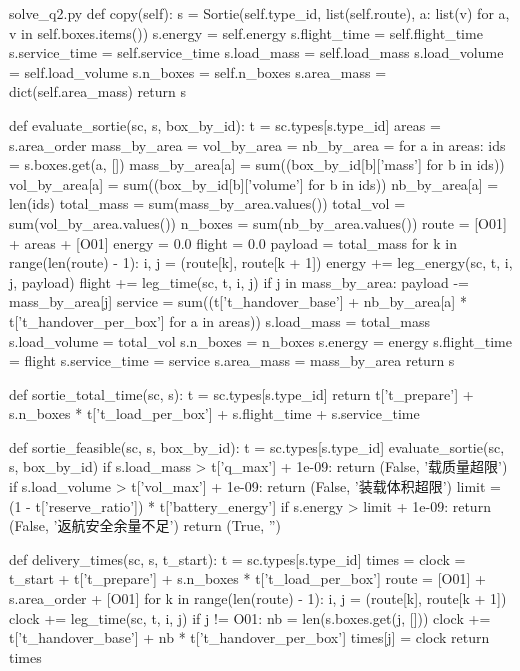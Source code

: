\documentclass[bwprint]{gmcmthesis}
\begin{document}
\begin{appendices}
\begin{Python}{solve\_q2.py}
    def copy(self):
        s = Sortie(self.type_id, list(self.route), {a: list(v) for a, v in self.boxes.items()})
        s.energy = self.energy
        s.flight_time = self.flight_time
        s.service_time = self.service_time
        s.load_mass = self.load_mass
        s.load_volume = self.load_volume
        s.n_boxes = self.n_boxes
        s.area_mass = dict(self.area_mass)
        return s

def evaluate_sortie(sc, s, box_by_id):
    t = sc.types[s.type_id]
    areas = s.area_order
    mass_by_area = {}
    vol_by_area = {}
    nb_by_area = {}
    for a in areas:
        ids = s.boxes.get(a, [])
        mass_by_area[a] = sum((box_by_id[b]['mass'] for b in ids))
        vol_by_area[a] = sum((box_by_id[b]['volume'] for b in ids))
        nb_by_area[a] = len(ids)
    total_mass = sum(mass_by_area.values())
    total_vol = sum(vol_by_area.values())
    n_boxes = sum(nb_by_area.values())
    route = [O01] + areas + [O01]
    energy = 0.0
    flight = 0.0
    payload = total_mass
    for k in range(len(route) - 1):
        i, j = (route[k], route[k + 1])
        energy += leg_energy(sc, t, i, j, payload)
        flight += leg_time(sc, t, i, j)
        if j in mass_by_area:
            payload -= mass_by_area[j]
    service = sum((t['t_handover_base'] + nb_by_area[a] * t['t_handover_per_box'] for a in areas))
    s.load_mass = total_mass
    s.load_volume = total_vol
    s.n_boxes = n_boxes
    s.energy = energy
    s.flight_time = flight
    s.service_time = service
    s.area_mass = mass_by_area
    return s

def sortie_total_time(sc, s):
    t = sc.types[s.type_id]
    return t['t_prepare'] + s.n_boxes * t['t_load_per_box'] + s.flight_time + s.service_time

def sortie_feasible(sc, s, box_by_id):
    t = sc.types[s.type_id]
    evaluate_sortie(sc, s, box_by_id)
    if s.load_mass > t['q_max'] + 1e-09:
        return (False, '载质量超限')
    if s.load_volume > t['vol_max'] + 1e-09:
        return (False, '装载体积超限')
    limit = (1 - t['reserve_ratio']) * t['battery_energy']
    if s.energy > limit + 1e-09:
        return (False, '返航安全余量不足')
    return (True, '')

def delivery_times(sc, s, t_start):
    t = sc.types[s.type_id]
    times = {}
    clock = t_start + t['t_prepare'] + s.n_boxes * t['t_load_per_box']
    route = [O01] + s.area_order + [O01]
    for k in range(len(route) - 1):
        i, j = (route[k], route[k + 1])
        clock += leg_time(sc, t, i, j)
        if j != O01:
            nb = len(s.boxes.get(j, []))
            clock += t['t_handover_base'] + nb * t['t_handover_per_box']
            times[j] = clock
    return times


\end{Python}
\end{appendices}
\end{document}
